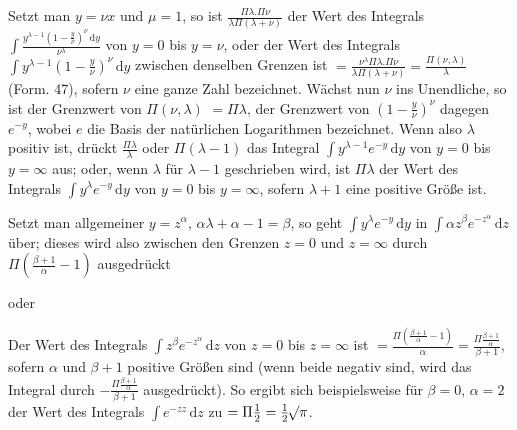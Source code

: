 Setzt man $y=\nu x$ und $\mu=1$, so ist $\frac{\Pi\lambda.\Pi\nu}{\lambda\Pi(\lambda+\nu)}$ der Wert des Integrals $\int\frac{y^{\lambda-1}(1-\frac y\nu)^\nu\,\mathrm{d}y}{\nu^\lambda}$ von $y=0$ bis $y=\nu$, oder der Wert des Integrals $\int y^{\lambda-1}(1-\frac y\nu)^\nu\,\mathrm{d}y$ zwischen denselben Grenzen ist $=\frac{\nu^\lambda\Pi\lambda.\Pi\nu}{\lambda\Pi(\lambda+\nu)}
=\frac{\Pi(\nu,\lambda)}\lambda$ (Form. 47), sofern $\nu$ eine ganze Zahl bezeichnet. Wächst nun $\nu$ ins Unendliche, so ist der Grenzwert von $\Pi(\nu,\lambda)$ $=\Pi\lambda$, der Grenzwert von $(1-\frac y\nu)^\nu$ dagegen $e^{-y}$, wobei $e$ die Basis der natürlichen Logarithmen bezeichnet. Wenn also $\lambda$ positiv ist, drückt $\frac{\Pi\lambda}\lambda$ oder $\Pi(\lambda-1)$ das Integral $\int y^{\lambda-1}e^{-y}\,\mathrm{d}y$ von $y=0$ bis $y=\infty$ aus; oder, wenn $\lambda$ für $\lambda-1$ geschrieben wird, ist $\Pi\lambda$ der Wert des Integrals $\int y^\lambda e^{-y}\,\mathrm{d}y$ von $y=0$ bis $y=\infty$, sofern $\lambda+1$ eine positive Größe ist.

Setzt man allgemeiner $y=z^\alpha$, $\alpha\lambda+\alpha-1=\beta$, so geht $\int y^\lambda e^{-y}\,\mathrm{d}y$ in $\int\alpha z^\beta e^{-z^\alpha}\,\mathrm{d}z$ über; dieses wird also zwischen den Grenzen $z=0$ und $z=\infty$ durch $\Pi(\frac{\beta+1}\alpha-1)$ ausgedrückt

\noindent oder

Der Wert des Integrals $\int z^\beta e^{-z^\alpha}\,\mathrm{d}z$ von $z=0$ bis $z=\infty$ ist $=\frac{\Pi(\frac{\beta+1}\alpha-1)}\alpha
=\frac{\Pi\frac{\beta+1}\alpha}{\beta+1}$, sofern $\alpha$ und $\beta+1$ positive Größen sind (wenn beide negativ sind, wird das Integral durch $-\frac{\Pi\frac{\beta+1}\alpha}{\beta+1}$ ausgedrückt). So ergibt sich beispielsweise für $\beta=0$, $\alpha=2$ der Wert des Integrals $\int e^{-zz}\,\mathrm{d}z$ zu $=\Pi\frac12=\frac12\mathord{{}^{}\!\surd}\pi$.

